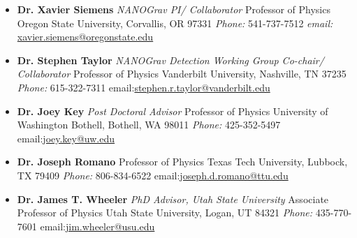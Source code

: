 \documentclass[11pt,letterpaper,sans,unicode]{moderncv}
\newcommand{\blucirc}{{\color{color1} $\circ\;\;$}}
\begin{document}
	\renewcommand\labelitemi{\blucirc}
	\begin{itemize}[leftmargin=8mm]
	\setlength\itemsep{0.05mm}
	\item \textbf{Dr. Xavier Siemens} \emph{NANOGrav PI/ Collaborator}
        		\newline Professor of Physics
		\newline Oregon State University, Corvallis, OR 97331
		\newline \emph{Phone:} 541-737-7512 \qquad \emph{email:} \url{xavier.siemens@oregonstate.edu}
		\newline
	\item \textbf{Dr. Stephen Taylor} \emph{NANOGrav Detection Working Group Co-chair/ Collaborator}
       		\newline Professor of Physics
		\newline Vanderbilt University, Nashville, TN 37235
		\newline \emph{Phone:} 615-322-7311 \qquad email:\url{stephen.r.taylor@vanderbilt.edu}
		\newline
	\item \textbf{Dr. Joey Key} \emph{Post Doctoral Advisor}
       		\newline Professor of Physics
		\newline University of Washington Bothell, Bothell, WA 98011
		\newline \emph{Phone:} 425-352-5497 \qquad email:\url{joey.key@uw.edu}
		\newline
	\item \textbf{Dr. Joseph Romano} %
       		\newline Professor of Physics
		\newline Texas Tech University, Lubbock, TX 79409
		\newline \emph{Phone:} 806-834-6522 \qquad email:\url{joseph.d.romano@ttu.edu}
		\newline
	\item \textbf{Dr. James T. Wheeler} \emph{PhD Advisor, Utah State University}
        		\newline Associate Professor of Physics
		\newline Utah State University, Logan, UT 84321
		\newline \emph{Phone:} 435-770-7601 \qquad email:\url{jim.wheeler@usu.edu}
		\newline

\end{itemize}
\end{document}
